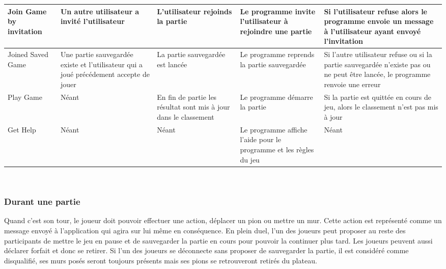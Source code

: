 \documentclass[french, utf8]{article}
\begin{document}
\newpage
\begin{center}
\begin{tabular}{|m{3cm}|m{3cm}|m{3cm}|m{3cm}|m{3cm}|}
\hline Join Game by invitation & Un autre utilisateur a invité l'utilisateur & L'utilisateur rejoinds la partie & Le programme invite l'utilisateur à rejoindre une partie & Si l'utilisateur refuse alors le programme envoie un message à l'utilisateur ayant envoyé l'invitation \\
\hline Joined Saved Game & Une partie sauvegardée existe et l'utilisateur qui a joué précédement accepte de jouer & La partie sauvegardée est lancée & Le programme reprends la partie sauvegardée  & Si l'autre utilisateur refuse ou si la partie sauvegardée n'existe pas ou ne peut être lancée, le programme renvoie une erreur \\
\hline Play Game & Néant & En fin de partie les résultat sont mis à jour dans le classement & Le programme démarre la partie & Si la partie est quittée en cours de jeu, alors le classement n'est pas mis à jour \\
\hline Get Help & Néant & Néant & Le programme affiche l'aide pour le programme et les règles du jeu & Néant \\
\hline
\end{tabular}\\
\end{center}

\subsubsection{Durant une partie}
Quand c'est son tour, le joueur doit pouvoir effectuer une action, déplacer un pion ou mettre un mur. Cette action est représenté comme un message envoyé à l'application qui agira sur lui même en conséquence.
En plein duel, l'un des joueurs peut proposer au reste des participants de mettre le jeu en pause et de sauvegarder la partie en cours pour pouvoir la continuer plus tard. Les joueurs peuvent aussi déclarer forfait et donc se retirer.
Si l'un des joueurs se déconnecte sans proposer de sauvegarder la partie, il est considéré comme disqualifié, ses murs posés seront toujours présents mais ses pions se retrouveront retirés du plateau.
\newline
\end{document}
